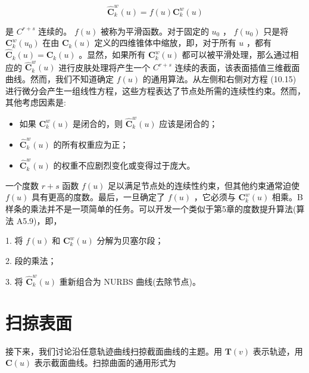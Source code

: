 \documentclass[../main.tex]{subfiles}
\begin{document}
\[
{\widehat{\mathbf{C}}}_{k}^{w}\left( u\right)  = f\left( u\right) {\mathbf{C}}_{k}^{w}\left( u\right)  \tag{10.15}
\]

是 \({C}^{r + s}\) 连续的。 \(f\left( u\right)\) 被称为平滑函数。对于固定的 \({u}_{0}\) ， \(f\left( {u}_{0}\right)\) 只是将 \({\mathbf{C}}_{k}^{w}\left( {u}_{0}\right)\) 在由 \({\mathbf{C}}_{k}\left( u\right)\) 定义的四维锥体中缩放，即，对于所有 \(u\) ，都有 \({\widehat{\mathbf{C}}}_{k}\left( u\right)  = {\mathbf{C}}_{k}\left( u\right)\) 。显然，如果所有 \({\mathbf{C}}_{k}^{w}\left( u\right)\) 都可以被平滑处理，那么通过相应的 \({\widehat{\mathbf{C}}}_{k}^{w}\left( u\right)\) 进行皮肤处理将产生一个 \({C}^{r + s}\) 连续的表面，该表面插值三维截面曲线。然而，我们不知道确定 \(f\left( u\right)\) 的通用算法。从左侧和右侧对方程 (10.15) 进行微分会产生一组线性方程，这些方程表达了节点处所需的连续性约束。然而，其他考虑因素是:

\begin{itemize}
\item 如果 \({\mathbf{C}}_{k}^{w}\left( u\right)\) 是闭合的，则 \({\widehat{\mathbf{C}}}_{k}^{w}\left( u\right)\) 应该是闭合的；
\end{itemize}

\begin{itemize}
\item \({\widehat{\mathbf{C}}}_{k}^{w}\left( u\right)\) 的所有权重应为正；
\end{itemize}

\begin{itemize}
\item \({\widehat{\mathbf{C}}}_{k}^{w}\left( u\right)\) 的权重不应剧烈变化或变得过于庞大。
\end{itemize}

一个度数 \(r + s\) 函数 \(f\left( u\right)\) 足以满足节点处的连续性约束，但其他约束通常迫使 \(f\left( u\right)\) 具有更高的度数。最后，一旦确定了 \(f\left( u\right)\) ，它必须与 \({\mathbf{C}}_{k}^{w}\left( u\right)\) 相乘。B样条的乘法并不是一项简单的任务。可以开发一个类似于第5章的度数提升算法(算法 A5.9)，即，

1. 将 \(f\left( u\right)\) 和 \({\mathbf{C}}_{k}^{w}\left( u\right)\) 分解为贝塞尔段；

2. 段的乘法；

3. 将 \({\widehat{\mathbf{C}}}_{k}^{w}\left( u\right)\) 重新组合为 NURBS 曲线(去除节点)。


\section{扫掠表面}
接下来，我们讨论沿任意轨迹曲线扫掠截面曲线的主题。用 \(\mathbf{T}\left( v\right)\) 表示轨迹，用 \(\mathbf{C}\left( u\right)\) 表示截面曲线。扫掠曲面的通用形式为
\end{document}
